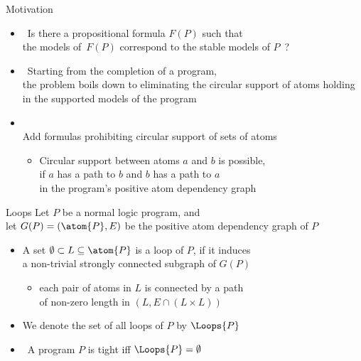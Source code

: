 \begin{frame}[c]{Motivation}
  \begin{itemize}
  \item<1->  \
    Is there a propositional formula $F(P)$ such that\\ the models of~$F(P)$ correspond to the
    stable models of $P$~?
    \bigskip
  \item<2->  \
    Starting from the completion of a program,\\
    the problem boils down to eliminating the circular support of atoms
    holding in the supported models of the program
    \medskip
  \item<3->  \\
    Add formulas prohibiting circular support of sets of atoms
    \medskip
    \begin{itemize}\normalsize
    \item<4->[\itarrow]
      Circular support between atoms $a$ and $b$ is possible,\\
      if $a$ has a path to $b$ and $b$ has a path to $a$\\
      in the program's positive atom dependency graph
    \end{itemize}
  \end{itemize}
\end{frame}
\begin{frame}{Loops}
  \bigskip
  Let $P$ be a normal logic program, and\\
  let $G(P) = (\atom{P},E)$ be the positive atom dependency graph of $P$
  \par
  \smallskip
  \begin{itemize}
  \item<2-> A set $\emptyset\subset L \subseteq \atom{P}$ is a \alert{loop} of $P$,
    if it induces\\ a non-trivial strongly connected subgraph of $G(P)$
    \begin{itemize}\normalsize
    \item<3->[\itarrow] each pair of atoms in $L$ is connected by a path\\
      of non-zero length in $(L,E\cap(L \times L))$
    \end{itemize}
    \medskip
  \item<4-> We denote the set of all loops of $P$ by $\Loops{P}$
    \medskip
  \item<5-> \structure{Note} \ A program $P$ is tight iff $\Loops{P}=\emptyset$
  \end{itemize}
\end{frame}
